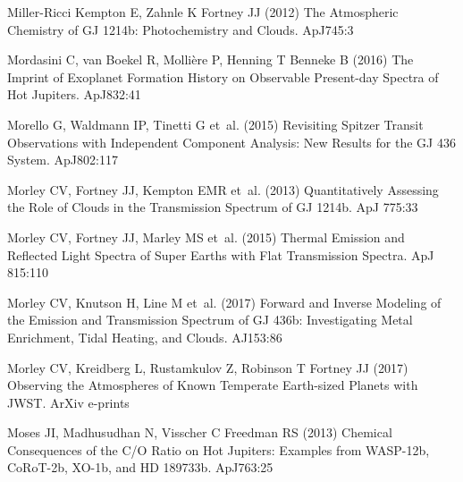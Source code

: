 \documentclass[graybox,natbib,nosecnum]{svmult}
\newcommand*\aj{AJ}
\newcommand*\apj{ApJ}
\begin{document}
\begin{thebibliography}{110}
{Miller-Ricci Kempton} E, {Zahnle} K {Fortney} JJ (2012) {The Atmospheric
  Chemistry of GJ 1214b: Photochemistry and Clouds}. \apj 745:3

{Mordasini} C, {van Boekel} R, {Molli{\`e}re} P, {Henning} T {Benneke} B (2016)
  {The Imprint of Exoplanet Formation History on Observable Present-day Spectra
  of Hot Jupiters}. \apj 832:41

{Morello} G, {Waldmann} IP, {Tinetti} G et~al. (2015) {Revisiting Spitzer
  Transit Observations with Independent Component Analysis: New Results for the
  GJ 436 System}. \apj 802:117

{Morley} CV, {Fortney} JJ, {Kempton} EMR et~al. (2013) {Quantitatively
  Assessing the Role of Clouds in the Transmission Spectrum of GJ 1214b}. \apj
  775:33

{Morley} CV, {Fortney} JJ, {Marley} MS et~al. (2015) {Thermal Emission and
  Reflected Light Spectra of Super Earths with Flat Transmission Spectra}. \apj
  815:110

{Morley} CV, {Knutson} H, {Line} M et~al. (2017{}) {Forward and
  Inverse Modeling of the Emission and Transmission Spectrum of GJ 436b:
  Investigating Metal Enrichment, Tidal Heating, and Clouds}. \aj 153:86

{Morley} CV, {Kreidberg} L, {Rustamkulov} Z, {Robinson} T {Fortney} JJ
  (2017{}) {Observing the Atmospheres of Known Temperate
  Earth-sized Planets with JWST}. ArXiv e-prints

{Moses} JI, {Madhusudhan} N, {Visscher} C {Freedman} RS (2013) {Chemical
  Consequences of the C/O Ratio on Hot Jupiters: Examples from WASP-12b,
  CoRoT-2b, XO-1b, and HD 189733b}. \apj 763:25


\end{thebibliography}
\end{document}
